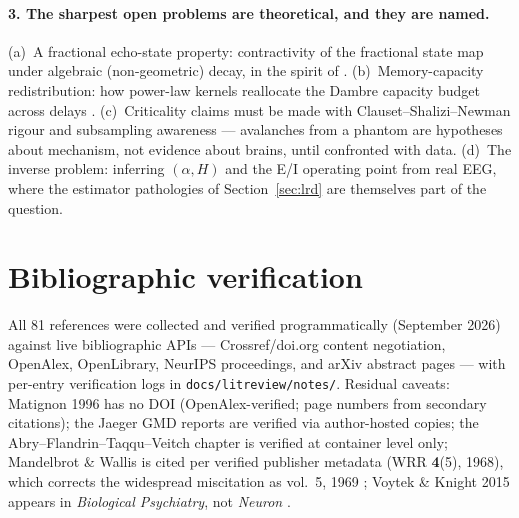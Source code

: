 \documentclass[11pt,a4paper]{article}
\begin{document}
\paragraph{3. The sharpest open problems are theoretical, and they are named.}
(a)~A fractional echo-state property: contractivity of the fractional state
map under algebraic (non-geometric) decay, in the spirit of
\cite{buehner2006tighter,yildiz2012echo}.
(b)~Memory-capacity redistribution: how power-law kernels reallocate the
Dambre capacity budget across delays \cite{dambre2012capacity}.
(c)~Criticality claims must be made with Clauset--Shalizi--Newman rigour and
subsampling awareness \cite{clauset2009power,priesemann2014spike} ---
avalanches from a phantom are hypotheses about mechanism, not evidence about
brains, until confronted with data.
(d)~The inverse problem: inferring $(\alpha, H)$ and the E/I operating point
from real EEG, where the estimator pathologies of
Section~\ref{sec:lrd} are themselves part of the question.

\appendix

\section{Bibliographic verification}
\label{app:verification}

All 81 references were collected and verified programmatically (September
2026) against live bibliographic APIs --- Crossref/doi.org content
negotiation, OpenAlex, OpenLibrary, NeurIPS proceedings, and arXiv abstract
pages --- with per-entry verification logs in \texttt{docs/litreview/notes/}.
Residual caveats: Matignon 1996 \cite{matignon1996stability} has no DOI
(OpenAlex-verified; page numbers from secondary citations); the Jaeger GMD
reports \cite{jaeger2001echo,jaeger2002memory} are verified via author-hosted
copies; the Abry--Flandrin--Taqqu--Veitch chapter \cite{abry2003self} is
verified at container level only; Mandelbrot \& Wallis is cited per verified
publisher metadata (WRR \textbf{4}(5), 1968), which corrects the widespread
miscitation as vol.~5, 1969 \cite{mandelbrot1969noah}; Voytek \& Knight 2015
appears in \emph{Biological Psychiatry}, not \emph{Neuron}
\cite{voytek2015dynamic}.



\end{document}
